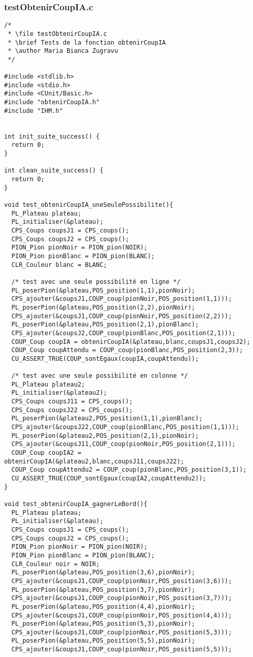 \subsubsection{testObtenirCoupIA.c}
\begin{lstlisting}
/*
 * \file testObtenirCoupIA.c
 * \brief Tests de la fonction obtenirCoupIA
 * \author Maria Bianca Zugravu
 */

#include <stdlib.h>
#include <stdio.h>
#include <CUnit/Basic.h>
#include "obtenirCoupIA.h"
#include "IHM.h"


int init_suite_success() {
  return 0;
}

int clean_suite_success() {
  return 0;
}

void test_obtenirCoupIA_uneSeulePossibilite(){
  PL_Plateau plateau;
  PL_initialiser(&plateau);
  CPS_Coups coupsJ1 = CPS_coups();
  CPS_Coups coupsJ2 = CPS_coups();
  PION_Pion pionNoir = PION_pion(NOIR);
  PION_Pion pionBlanc = PION_pion(BLANC);
  CLR_Couleur blanc = BLANC;

  /* test avec une seule possibilité en ligne */
  PL_poserPion(&plateau,POS_position(1,1),pionNoir);
  CPS_ajouter(&coupsJ1,COUP_coup(pionNoir,POS_position(1,1)));
  PL_poserPion(&plateau,POS_position(2,2),pionNoir);
  CPS_ajouter(&coupsJ1,COUP_coup(pionNoir,POS_position(2,2)));
  PL_poserPion(&plateau,POS_position(2,1),pionBlanc);
  CPS_ajouter(&coupsJ2,COUP_coup(pionBlanc,POS_position(2,1)));
  COUP_Coup coupIA = obtenirCoupIA(&plateau,blanc,coupsJ1,coupsJ2);
  COUP_Coup coupAttendu = COUP_coup(pionBlanc,POS_position(2,3));
  CU_ASSERT_TRUE(COUP_sontEgaux(coupIA,coupAttendu));

  /* test avec une seule possibilité en colonne */
  PL_Plateau plateau2;
  PL_initialiser(&plateau2);
  CPS_Coups coupsJ11 = CPS_coups();
  CPS_Coups coupsJ22 = CPS_coups();
  PL_poserPion(&plateau2,POS_position(1,1),pionBlanc);
  CPS_ajouter(&coupsJ22,COUP_coup(pionBlanc,POS_position(1,1)));
  PL_poserPion(&plateau2,POS_position(2,1),pionNoir);
  CPS_ajouter(&coupsJ11,COUP_coup(pionNoir,POS_position(2,1)));
  COUP_Coup coupIA2 = obtenirCoupIA(&plateau2,blanc,coupsJ11,coupsJ22);
  COUP_Coup coupAttendu2 = COUP_coup(pionBlanc,POS_position(3,1));
  CU_ASSERT_TRUE(COUP_sontEgaux(coupIA2,coupAttendu2));
}

void test_obtenirCoupIA_gagnerLeBord(){
  PL_Plateau plateau;
  PL_initialiser(&plateau);
  CPS_Coups coupsJ1 = CPS_coups();
  CPS_Coups coupsJ2 = CPS_coups();
  PION_Pion pionNoir = PION_pion(NOIR);
  PION_Pion pionBlanc = PION_pion(BLANC);
  CLR_Couleur noir = NOIR;
  PL_poserPion(&plateau,POS_position(3,6),pionNoir);
  CPS_ajouter(&coupsJ1,COUP_coup(pionNoir,POS_position(3,6)));
  PL_poserPion(&plateau,POS_position(3,7),pionNoir);
  CPS_ajouter(&coupsJ1,COUP_coup(pionNoir,POS_position(3,7)));
  PL_poserPion(&plateau,POS_position(4,4),pionNoir);
  CPS_ajouter(&coupsJ1,COUP_coup(pionNoir,POS_position(4,4)));
  PL_poserPion(&plateau,POS_position(5,3),pionNoir);
  CPS_ajouter(&coupsJ1,COUP_coup(pionNoir,POS_position(5,3)));
  PL_poserPion(&plateau,POS_position(5,5),pionNoir);
  CPS_ajouter(&coupsJ1,COUP_coup(pionNoir,POS_position(5,5)));
  

\end{lstlisting}
